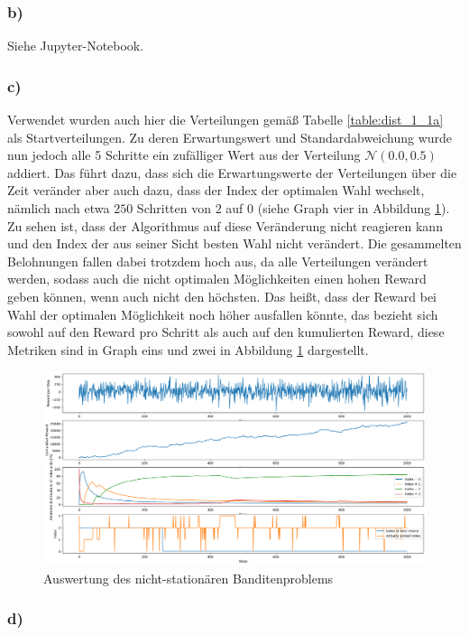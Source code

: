\documentclass[11pt]{article}
\begin{document}
\subsubsection*{b)}

Siehe Jupyter-Notebook.

\subsubsection*{c)}

Verwendet wurden auch hier die Verteilungen gemäß Tabelle \ref{table:dist_1_1a} als Startverteilungen. Zu deren Erwartungswert und Standardabweichung wurde nun jedoch alle 5 Schritte ein zufälliger Wert aus der Verteilung $\mathcal{N}(0.0, 0.5)$ addiert. Das führt dazu, dass sich die Erwartungswerte der Verteilungen über die Zeit veränder aber auch dazu, dass der Index der optimalen Wahl wechselt, nämlich nach etwa $250$ Schritten von $2$ auf $0$ (siehe Graph vier in Abbildung \ref{img:1_2c}). Zu sehen ist, dass der Algorithmus auf diese Veränderung nicht reagieren kann und den Index der aus seiner Sicht besten Wahl nicht verändert. Die gesammelten Belohnungen fallen dabei trotzdem hoch aus, da alle Verteilungen verändert werden, sodass auch die nicht optimalen Möglichkeiten einen hohen Reward geben können, wenn auch nicht den höchsten. Das heißt, dass der Reward bei Wahl der optimalen Möglichkeit noch höher ausfallen könnte, das bezieht sich sowohl auf den Reward pro Schritt als auch auf den kumulierten Reward, diese Metriken sind in Graph eins und zwei in Abbildung \ref{img:1_2c} dargestellt.

\begin{figure}[h]
    \centering
    \includegraphics[width=\textwidth]{img/1_2c.png}
    \caption{Auswertung des nicht-stationären Banditenproblems}
    \label{img:1_2c}
\end{figure}

\subsubsection*{d)}

\end{document}
